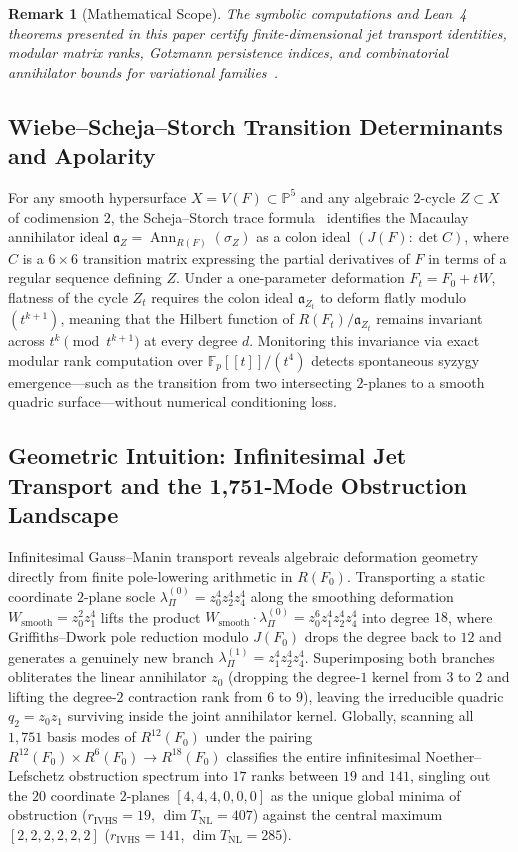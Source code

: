 \documentclass[11pt,a4paper]{article}
\newtheorem{remark}[theorem]{Remark}
\begin{document}
\begin{remark}[Mathematical Scope]
  The symbolic computations and Lean~4 theorems presented in this paper certify finite-dimensional jet transport identities, modular matrix ranks, Gotzmann persistence indices, and combinatorial annihilator bounds for variational families~\cite{Deligne2000,Voisin2002}.
\end{remark}

\subsection{Wiebe--Scheja--Storch Transition Determinants and Apolarity}
For any smooth hypersurface $X = V(F) \subset \mathbb{P}^5$ and any algebraic $2$-cycle $Z \subset X$ of codimension $2$, the Scheja--Storch trace formula~\cite{SchejaStorch1975} identifies the Macaulay annihilator ideal $\mathfrak{a}_Z = \operatorname{Ann}_{R(F)}(\sigma_Z)$ as a colon ideal $(J(F) : \det C)$, where $C$ is a $6 \times 6$ transition matrix expressing the partial derivatives of $F$ in terms of a regular sequence defining $Z$. Under a one-parameter deformation $F_t = F_0 + t W$, flatness of the cycle $Z_t$ requires the colon ideal $\mathfrak{a}_{Z_t}$ to deform flatly modulo $(t^{k+1})$, meaning that the Hilbert function of $R(F_t) / \mathfrak{a}_{Z_t}$ remains invariant across $t^k \pmod{t^{k+1}}$ at every degree $d$. Monitoring this invariance via exact modular rank computation over $\mathbb{F}_p[[t]]/(t^4)$ detects spontaneous syzygy emergence---such as the transition from two intersecting $2$-planes to a smooth quadric surface---without numerical conditioning loss.

\subsection{Geometric Intuition: Infinitesimal Jet Transport and the 1,751-Mode Obstruction Landscape}

Infinitesimal Gauss--Manin transport reveals algebraic deformation geometry directly from finite pole-lowering arithmetic in $R(F_0)$. Transporting a static coordinate $2$-plane socle $\lambda_\Pi^{(0)} = z_0^4 z_2^4 z_4^4$ along the smoothing deformation $W_{\mathrm{smooth}} = z_0^2 z_1^4$ lifts the product $W_{\mathrm{smooth}} \cdot \lambda_\Pi^{(0)} = z_0^6 z_1^4 z_2^4 z_4^4$ into degree $18$, where Griffiths--Dwork pole reduction modulo $J(F_0)$ drops the degree back to $12$ and generates a genuinely new branch $\lambda_\Pi^{(1)} = z_1^4 z_2^4 z_4^4$. Superimposing both branches obliterates the linear annihilator $z_0$ (dropping the degree-$1$ kernel from $3$ to $2$ and lifting the degree-$2$ contraction rank from $6$ to $9$), leaving the irreducible quadric $q_2 = z_0 z_1$ surviving inside the joint annihilator kernel. Globally, scanning all $1{,}751$ basis modes of $R^{12}(F_0)$ under the pairing $R^{12}(F_0) \times R^6(F_0) \to R^{18}(F_0)$ classifies the entire infinitesimal Noether--Lefschetz obstruction spectrum into $17$ ranks between $19$ and $141$, singling out the $20$ coordinate $2$-planes $[4,4,4,0,0,0]$ as the unique global minima of obstruction ($r_{\mathrm{IVHS}} = 19$, $\dim T_{\mathrm{NL}} = 407$) against the central maximum $[2,2,2,2,2,2]$ ($r_{\mathrm{IVHS}} = 141$, $\dim T_{\mathrm{NL}} = 285$).
\end{document}
